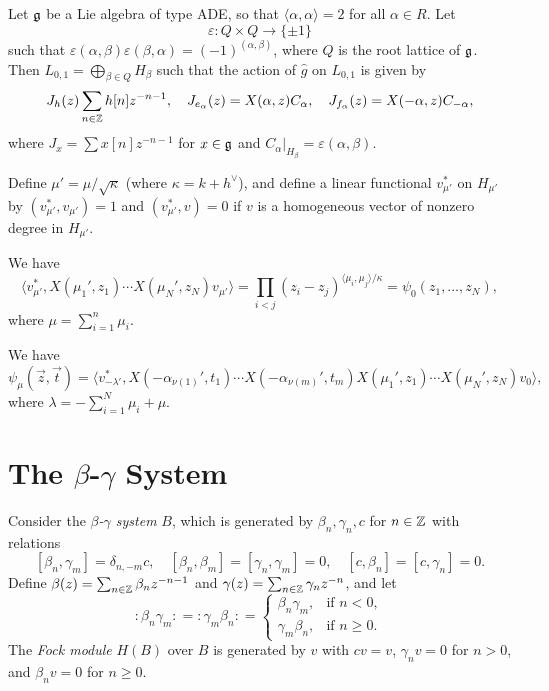 \begin{theorem}
  Let $\mathfrak{g}$ be a Lie algebra of type ADE, so
  that $\langle \alpha, \alpha \rangle = 2$
  for all $\alpha \in R$. Let
  \[
    \varepsilon : Q \times Q \longrightarrow \{\pm 1\}
  \]
  such that $\varepsilon(\alpha, \beta) \varepsilon(\beta, \alpha) = (-1)^{(\alpha, \beta)}$,
  where $Q$ is the root lattice of $\mathfrak{g}$.
  Then $L_{0, 1} = \bigoplus_{\beta \in Q} H_\beta$
  such that the action of $\widehat{g}$
  on $L_{0, 1}$ is given by
  \[
    J_{h}(z) \sum_{n \in \mathbb{Z}} h[n] z^{-n - 1}, \quad
    J_{e_\alpha}(z)
    = X(\alpha, z) C_\alpha, \quad
    J_{f_\alpha}(z)
    = X(-\alpha, z) C_{-\alpha},
  \]
  where $J_x = \sum x[n] z^{-n - 1}$ for
  $x \in \mathfrak{g}$ and $C_\alpha|_{H_\beta} = \varepsilon(\alpha, \beta)$.
\end{theorem}

\begin{definition}
  Define $\mu' = \mu / \sqrt{\kappa}$
  (where $\kappa = k + h^\vee$), and
  define a linear functional
  $v^*_{\mu'}$ on $H_{\mu'}$ by
  $(v^*_{\mu'}, v_{\mu'}) = 1$ and
  $(v^*_{\mu'}, v) = 0$ if $v$ is a
  homogeneous vector of nonzero degree in
  $H_{\mu'}$.
\end{definition}

\begin{prop}
  We have
  \[
    \langle v^*_{\mu'}, X(\mu_1', z_1) \cdots X(\mu_N', z_N) v_{\mu'} \rangle
    = \prod_{i < j} (z_i - z_j)^{\langle \mu_i, \mu_j \rangle / \kappa}
    = \psi_0(z_1, \dots, z_N),
  \]
  where $\mu = \sum_{i = 1}^n \mu_i$.
\end{prop}

\begin{corollary}
  We have
  \[
    \psi_\mu(\vec{z}, \vec{t})
    = \langle v^*_{-\lambda'}, X(-\alpha_{\nu(1)}', t_1) \cdots X(-\alpha_{\nu(m)}', t_m) X(\mu_1', z_1) \cdots X(\mu_N', z_N) v_{0} \rangle,
  \]
  where $\lambda = -\sum_{i = 1}^N \mu_i + \mu$.
\end{corollary}

\section{The \texorpdfstring{$\beta$-$\gamma$}{beta-gamma} System}

\begin{remark}
  Consider the \emph{$\beta$-$\gamma$ system}
  $B$, which is
  generated by $\beta_n, \gamma_n, c$ for
  $n \in \mathbb{Z}$ with
  relations
  \[
    [\beta_n, \gamma_m] = \delta_{n, -m} c,
    \quad
    [\beta_n, \beta_m] = [\gamma_n, \gamma_m] = 0, \quad
    [c, \beta_n] = [c, \gamma_n] = 0.
  \]
  Define $\beta(z) = \sum_{n \in \mathbb{Z}} \beta_n z^{-n - 1}$
  and $\gamma(z) = \sum_{n \in \mathbb{Z}} \gamma_n z^{-n}$, and let
  \[
    {:} \beta_n \gamma_m {:}
    = {:} \gamma_m \beta_n {:}
    =
    \begin{cases}
      \beta_n \gamma_m, & \text{if } n < 0, \\
      \gamma_m \beta_n, & \text{if } n \ge 0.
    \end{cases}
  \]
  The \emph{Fock module} $H(B)$ over $B$ is
  generated by $v$ with
  $cv = v$, $\gamma_n v = 0$ for $n > 0$,
  and $\beta_n v = 0$ for $n \ge 0$.
\end{remark}
